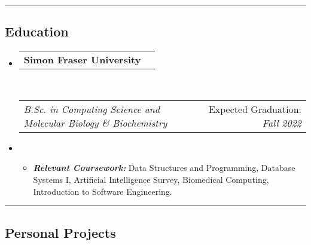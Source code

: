 \documentclass[10pt,a4paper]{article}
\makeatletter
\newcommand{\headerrow}[2]
{\begin{tabular*}{\linewidth}{l@{\extracolsep{\fill}}r}
	#1 &
	#2 \\
\end{tabular*}}
\makeatother
\begin{document}
\vspace{.2em}
\hrule %

\subsection*{Education}

\vspace{-0.2em}

\begin{itemize}[leftmargin=0em]

	\parskip=0.1em

	\item[] 
	\headerrow
		{\textbf{Simon Fraser University}}
        {}
	\\
	\headerrow
		{\textit{B.Sc. in Computing Science and Molecular Biology \& Biochemistry}}
		{\small{{Expected Graduation:} \textit{Fall 2022}}}
		
	\item[]
	\begin{itemize}
	\item 
	{ \small
	\textbf{\textit{Relevant Coursework: }}Data Structures and Programming, Database Systems I,  Artificial Intelligence Survey, Biomedical Computing, Introduction to Software Engineering.
	}
	\end{itemize}
	

\end{itemize}

\vspace{0.2em}
\hrule %
\vspace{-0.4em}

\subsection*{Personal Projects}

\vspace{-0.2em}
\end{document}
